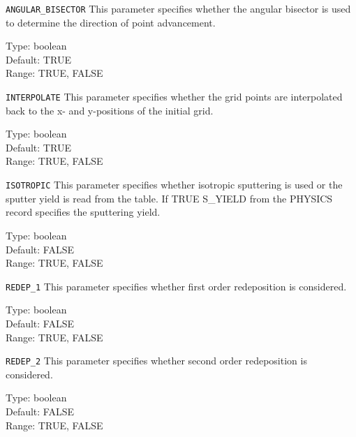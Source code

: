 \begin{keydescription}{\texttt{ANGULAR_BISECTOR}}
This parameter specifies whether the angular bisector is used to determine the direction of point advancement.
\begin{keytab}
   Type:    \> boolean \\
   Default: \> TRUE \\
   Range:   \> TRUE, FALSE
\end{keytab}
\end{keydescription}

\begin{keydescription}{\texttt{INTERPOLATE}}
This parameter specifies whether the grid points are interpolated back to the x- and y-positions of the initial grid.
\begin{keytab}
   Type:    \> boolean \\
   Default: \> TRUE \\
   Range:   \> TRUE, FALSE
\end{keytab}
\end{keydescription}

\begin{keydescription}{\texttt{ISOTROPIC}}
This parameter specifies whether isotropic sputtering is used or the sputter yield is read from the table. If TRUE S\_YIELD from the PHYSICS record
specifies the sputtering yield.
\begin{keytab}
   Type:    \> boolean \\
   Default: \> FALSE \\
   Range:   \> TRUE, FALSE
\end{keytab}
\end{keydescription}

\begin{keydescription}{\texttt{REDEP_1}}
This parameter specifies whether first order redeposition is considered.
\begin{keytab}
   Type:    \> boolean \\
   Default: \> FALSE \\
   Range:   \> TRUE, FALSE
\end{keytab}
\end{keydescription}

\begin{keydescription}{\texttt{REDEP_2}}
This parameter specifies whether second order redeposition is considered.
\begin{keytab}
   Type:    \> boolean \\
   Default: \> FALSE \\
   Range:   \> TRUE, FALSE
\end{keytab}
\end{keydescription}

